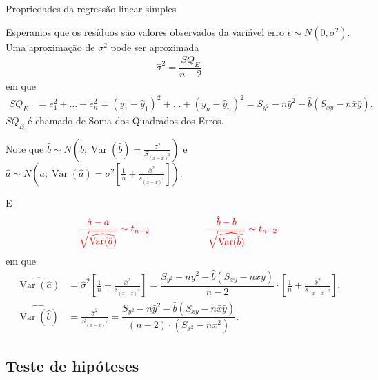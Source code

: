 \documentclass[8pt]{beamer}
\DeclareMathOperator{\vari}{Var}
\begin{document}
\begin{frame}{Propriedades da regressão linear simples}
	
\normalsize
	Esperamos que os resíduos são valores observados da variável erro $\epsilon \sim N(0, \sigma^2)$. Uma aproximação de $\sigma^2$   pode ser aproximada
	\begin{align*}
	\hat{\sigma}^2 = \dfrac{SQ_E}{n-2}
	\end{align*}
	em que 
	\begin{align*}
		SQ_E &= e_1^2 + \dots + e_n^2 = (y_1 - \hat{y}_1)^2 + \dots + (y_n - \hat{y}_n)^2=  S_{y^2} - n \bar{y}^2 -\hat{b} \left( S_{xy} - n \bar{x} \bar{y} \right).
	\end{align*}
	$SQ_E$ é chamado de Soma dos Quadrados dos Erros.
	
	Note que \textcolor{important}{ $\hat{b} \sim N\left(b;\vari(\hat{b}) = \frac{\sigma^2}{S_{(x-\bar{x})^2}}\right)$}  e \textcolor{important}{$\hat{a} \sim N\left(a; \vari(\hat{a}) = \sigma^2  \left[ \frac{1}{n} + \frac{\bar{x}^2}{s_{(x-\bar{x})^2}} \right] \right)$}.

E
\begin{align*}
\textcolor{red}{\dfrac{\hat{a} - a}{\sqrt{\widehat{\vari({\hat{a}})}}} \sim t_{n-2}}\qquad\qquad\qquad 
\textcolor{red}{\dfrac{\hat{b} - b}{\sqrt{\widehat{\vari({\hat{b}})}}} \sim t_{n-2}.}
\end{align*}
em que
\begin{align*}
\widehat{\vari({\hat{a}})} &= \hat\sigma^2 \left[  \frac{1}{n} + \frac{\bar{x}^2}{s_{(x-\bar{x})^2}} \right] =  \dfrac{ S_{y^2} - n \bar{y}^2 -\hat{b} \left( S_{xy} - n \bar{x} \bar{y} \right)}{n-2} \cdot \left[  \frac{1}{n} + \frac{\bar{x}^2}{s_{(x-\bar{x})^2}} \right],\\
\widehat{\vari({\hat{b}})} &= \frac{\hat\sigma^2}{S_{(x-\bar{x})^2}} = \dfrac{ S_{y^2} - n \bar{y}^2 -\hat{b} \left( S_{xy} - n \bar{x} \bar{y} \right)}{ (n - 2) \cdot  (S_{x^2} - n \bar{x}^2) }.
\end{align*}
\normalsize

\end{frame}

\subsection{Teste de hipóteses}
\end{document}
